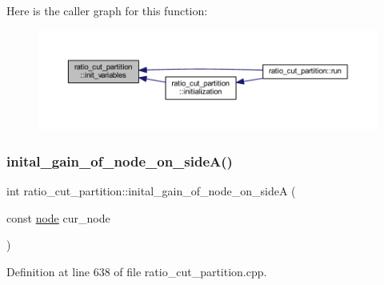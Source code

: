 Here is the caller graph for this function\+:\nopagebreak
\begin{figure}[H]
\begin{center}
\leavevmode
\includegraphics[width=350pt]{classratio__cut__partition_ab3054dcfbcd012aba57218fa6d0c471b_icgraph}
\end{center}
\end{figure}
\mbox{\label{classratio__cut__partition_a0f2caf60f5a9be58c983c84655537d51}} 
\subsubsection{\texorpdfstring{inital\+\_\+gain\+\_\+of\+\_\+node\+\_\+on\+\_\+side\+A()}{inital\_gain\_of\_node\_on\_sideA()}}
{\footnotesize\ttfamily int ratio\+\_\+cut\+\_\+partition\+::inital\+\_\+gain\+\_\+of\+\_\+node\+\_\+on\+\_\+sideA (\begin{DoxyParamCaption}\item[{const \mbox{\hyperlink{classnode}{node}}}]{cur\+\_\+node }\end{DoxyParamCaption})\hspace{0.3cm}{\ttfamily [protected]}}



Definition at line 638 of file ratio\+\_\+cut\+\_\+partition.\+cpp.


